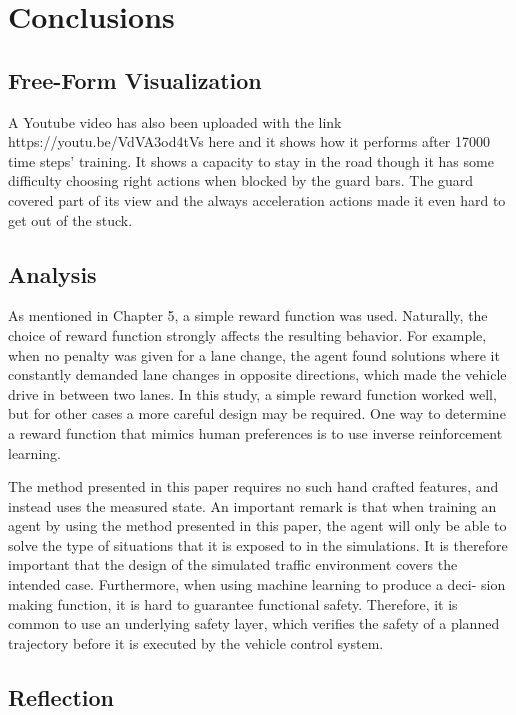 \chapter{Conclusions}

\section{Free-Form Visualization}

A Youtube video has also been uploaded with the link https://youtu.be/VdVA3od4tVs here and it shows how it performs after 17000 time steps' training. It shows a capacity to stay in the road though it has some difficulty choosing right actions when blocked by the guard bars. The guard covered part of its view and the always acceleration actions made it even hard to get out of the stuck.

\section{Analysis}

As mentioned in Chapter 5, a simple reward function was used. Naturally, the choice of reward function strongly affects the resulting behavior. For example, when no penalty was given for a lane change, the agent found solutions where it constantly demanded lane changes in opposite directions, which made the vehicle drive in between two lanes. In this study, a simple reward function worked well, but for other cases a more careful design may be required. One way to determine a reward function that mimics human preferences is to use inverse reinforcement learning.

The method presented in this paper requires no such hand crafted features, and instead uses the measured state. An important remark is that when training an agent by using the method presented in this paper, the agent will only be able to solve the type of situations that it is exposed to in the simulations. It is therefore important that the design of the simulated traffic environment covers the intended case. Furthermore, when using machine learning to produce a deci- sion making function, it is hard to guarantee functional safety. Therefore, it is common to use an underlying safety layer, which verifies the safety of a planned trajectory before it is executed by the vehicle control system.

\section{Reflection}

